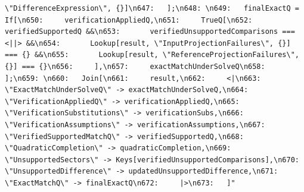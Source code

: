 \documentclass[11pt]{article}
\begin{document}
\begin{verbatim}
\"DifferenceExpression\", {}]\n647:   ];\n648: \n649:   finalExactQ = If[\n650:     verificationAppliedQ,\n651:     TrueQ[\n652:       verifiedSupportedQ &&\n653:       verifiedUnsupportedComparisons === <||> &&\n654:       Lookup[result, \"InputProjectionFailures\", {}] === {} &&\n655:       Lookup[result, \"ReferenceProjectionFailures\", {}] === {}\n656:     ],\n657:     exactMatchUnderSolveQ\n658:   ];\n659: \n660:   Join[\n661:     result,\n662:     <|\n663:       \"ExactMatchUnderSolveQ\" -> exactMatchUnderSolveQ,\n664:       \"VerificationAppliedQ\" -> verificationAppliedQ,\n665:       \"VerificationSubstitutions\" -> verificationSubs,\n666:       \"VerificationAssumptions\" -> verificationAssumptions,\n667:       \"VerifiedSupportedMatchQ\" -> verifiedSupportedQ,\n668:       \"QuadraticCompletion\" -> quadraticCompletion,\n669:       \"UnsupportedSectors\" -> Keys[verifiedUnsupportedComparisons],\n670:       \"UnsupportedDifference\" -> updatedUnsupportedDifference,\n671:       \"ExactMatchQ\" -> finalExactQ\n672:     |>\n673:   ]"
\end{verbatim}
\end{document}

